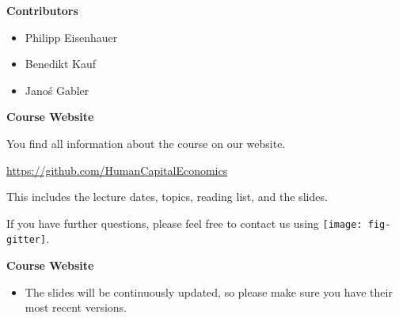 \begin{frame}\textbf{Contributors}\vspace{0.3cm}

\begin{itemize}\setlength\itemsep{1em}
\item Philipp Eisenhauer
\item Benedikt Kauf
\item Jano\'{s} Gabler
\end{itemize}

\end{frame}
\begin{frame}
	\textbf{Course Website}\vspace{0.3cm}

You find all information about the course on our website.

\begin{center}
\url{https://github.com/HumanCapitalEconomics}
\end{center}

This includes the lecture dates, topics, reading list, and the slides.\vspace{0.3cm}

If you have further questions, please feel free to contact us using
\texttt{[image: fig-gitter]}.

\end{frame}
\begin{frame}
	\textbf{Course Website}\vspace{0.3cm}

\begin{itemize}
\item The slides will be continuously updated, so please make sure you have their most recent versions.
\end{itemize}

\end{frame}
